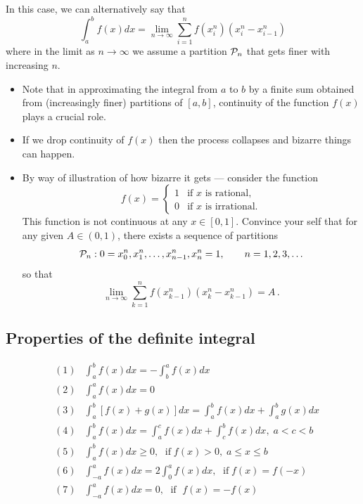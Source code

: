 \documentclass{article}
\begin{document}
In this case, we can alternatively say that
$$
\int_a^b f(x) dx = \lim_{n \rightarrow \infty} \sum_{i=1}^n f(x_i^n) (x_{i}^n-x_{i-1}^n)
$$
where in the limit as $n \rightarrow \infty$ we assume a partition ${\cal P}_n$ that gets finer with increasing $n$.
\begin{itemize}
\item
Note that in approximating the integral from $a$ to $b$ by a finite sum obtained from (increasingly finer) partitions of $[a, b]$,
continuity of the function $f(x)$ plays a crucial role. 
\item
If we drop continuity of $f(x)$ then the process collapses and bizarre things can happen.
\item
By way of illustration of how bizarre it gets --- consider the function
$$
f(x) = \left\{ \begin{array}{ll} 1 & \mbox{if } x \mbox{ is rational,}\\ 0 & \mbox{if } x \mbox{ is irrational.} \end{array} \right.
$$
This function is not continuous at any $x \in [0, 1]$. Convince your self that for any given $A \in (0, 1)$, there exists a sequence of partitions 
$$
{\cal P}_n : 0=x_0^n, x_1^n, \ldots, x_{n-1}^n, x_n^n = 1, \qquad n = 1, 2, 3, \ldots
$$
so that
$$
\lim_{n \rightarrow \infty} \sum_{k=1}^{n} f(x_{k-1}^n) \left( x_k^n - x_{k-1} ^n\right) = A\,.
$$
\end{itemize}
\subsection{Properties  of the definite integral}
\vspace{-.3cm}

\begin{eqnarray}
& (1) & \int_a^b f(x) dx = -\int_b^a f(x) dx   \nonumber \\
& (2) &\int_a^a f(x) dx = 0    \nonumber \\
& (3) &\int_a^b [f(x)+g(x)] dx = \int_a^b f(x) dx + \int_a^b g(x)
dx
\nonumber \\
& (4) & \int_a^b f(x) dx = \int_a^c f(x) dx + \int_c^b f(x) dx, \;
a<c<b    \nonumber \\
& (5) & \int_a^b f(x) dx \ge 0,\; \mbox{ if
} \; f(x) >0, \; a \leq x \leq b
 \nonumber \\
 & (6) & \int_{-a}^a f(x) dx =2 \int_{0}^a f(x) dx ,\; \mbox{ if
} \; f(x)= f(-x)
 \nonumber \\
& (7) & \int_{-a}^a f(x) dx = 0 ,\; \mbox{ if } \; f(x)= -f(x)
 \nonumber
 \end{eqnarray}
\end{document}
